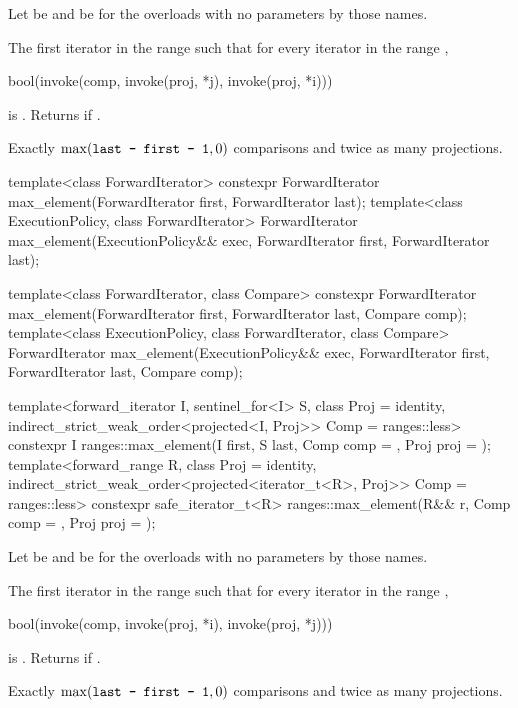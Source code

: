 \begin{itemdescr}
\pnum
Let  be 
and  be 
for the overloads with no parameters by those names.

\pnum
\returns
The first iterator  in the range 
such that for every iterator  in the range ,
\begin{codeblock}
bool(invoke(comp, invoke(proj, *j), invoke(proj, *i)))
\end{codeblock}
is .
Returns  if .

\pnum
\complexity
Exactly $\max(\texttt{last - first - 1}, 0)$ comparisons and
twice as many projections.
\end{itemdescr}

%
\begin{itemdecl}
template<class ForwardIterator>
  constexpr ForwardIterator max_element(ForwardIterator first, ForwardIterator last);
template<class ExecutionPolicy, class ForwardIterator>
  ForwardIterator max_element(ExecutionPolicy&& exec,
                              ForwardIterator first, ForwardIterator last);

template<class ForwardIterator, class Compare>
  constexpr ForwardIterator max_element(ForwardIterator first, ForwardIterator last,
                                        Compare comp);
template<class ExecutionPolicy, class ForwardIterator, class Compare>
  ForwardIterator max_element(ExecutionPolicy&& exec,
                              ForwardIterator first, ForwardIterator last,
                              Compare comp);

template<forward_iterator I, sentinel_for<I> S, class Proj = identity,
         indirect_strict_weak_order<projected<I, Proj>> Comp = ranges::less>
  constexpr I ranges::max_element(I first, S last, Comp comp = {}, Proj proj = {});
template<forward_range R, class Proj = identity,
         indirect_strict_weak_order<projected<iterator_t<R>, Proj>> Comp = ranges::less>
  constexpr safe_iterator_t<R>
    ranges::max_element(R&& r, Comp comp = {}, Proj proj = {});
\end{itemdecl}

\begin{itemdescr}
\pnum
Let  be 
and  be 
for the overloads with no parameters by those names.

\pnum
\returns
The first iterator  in the range 
such that for every iterator  in the range ,
\begin{codeblock}
bool(invoke(comp, invoke(proj, *i), invoke(proj, *j)))
\end{codeblock}
is .
Returns  if .

\pnum
\complexity
Exactly $\max(\texttt{last - first - 1}, 0)$ comparisons and
twice as many projections.
\end{itemdescr}

